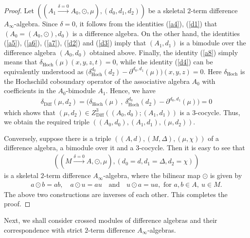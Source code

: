 \documentclass[a4paper,reqno,10pt]{amsart}
\theoremstyle{plain}
\theoremstyle{definition}
\theoremstyle{remark}
\begin{document}
\begin{proof}
    Let $(( A_1 \xrightarrow{\delta = 0} A_0, \odot, \mu), (d_0, d_1, d_2) )$ be a skeletal $2$-term difference $A_\infty$-algebra. Since $\delta = 0$, it follows from the identities (\ref{a4}), (\ref{d1}) that $(A_0 = (A_0, \odot), d_0)$ is a difference algebra. On the other hand, the identities (\ref{a5}), (\ref{a6}), (\ref{a7}), (\ref{d2}) and (\ref{d3}) imply that $(A_1, d_1)$ is a bimodule over the difference algebra $(A_0, d_0)$ obtained above. Finally, the identity (\ref{a8}) simply means that $\delta_\mathrm{Hoch} (\mu ) (x, y, z, t ) = 0$, while the identity (\ref{d4}) can be equivalently understood as $\big( \delta_\mathrm{Hoch}^{d_0} (d_2) - \partial^{d_0, d_1} (\mu) \big) (x, y, z) = 0$. Here $\delta_\mathrm{Hoch}$ is the Hochschild coboundary operator of the associative algebra $A_0$ with coefficients in the $A_0$-bimodule $A_1$. Hence, we have
    \begin{align*}
        \delta_\mathrm{Diff} (\mu, d_2) = \big(  \delta_\mathrm{Hoch} (\mu) ~ \!, ~ \! \delta_\mathrm{Hoch}^{d_0} (d_2) - \partial^{d_0, d_1} (\mu)  \big) = 0
    \end{align*}
    which shows that $(\mu, d_2) \in Z^3_{\mathrm{Diff}} ((A_0, d_0); (A_1, d_1) )$ is a $3$-cocycle. Thus, we obtain the required triple $((A_0, d_0), (A_1, d_1), (\mu, d_2) ).$

    \medskip

    Conversely, suppose there is a triple $((A, d), (M, \Delta), (\mu, \chi) )$ of a difference algebra, a bimodule over it and a $3$-cocycle. Then it is easy to see that
    \begin{align*}
         ((M \xrightarrow{\delta = 0} A, \odot, \mu ), (d_0 = d, d_1 = \Delta, d_2= \chi) )
    \end{align*}
    is a skeletal $2$-term difference $A_\infty$-algebra, where the bilinear map $\odot$ is given by
    \begin{align*}
        a \odot b = ab, \quad a \odot u = au ~~~ \text{ and } ~~~ u \odot a = ua, \text{ for } a, b \in A, ~ \! u \in M.
    \end{align*}
    The above two constructions are inverses of each other. This completes the proof.
\end{proof}


Next, we shall consider crossed modules of difference algebras and their correspondence with strict $2$-term difference $A_\infty$-algebras.
\end{document}
